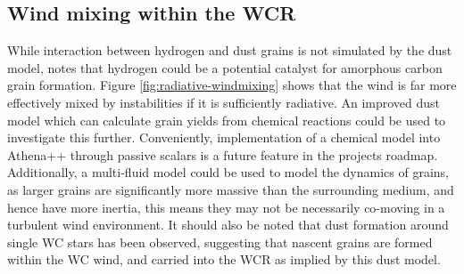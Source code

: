 
\subsection{Wind mixing within the WCR}


While interaction between hydrogen and dust grains is not simulated by the dust model, \textcite{leteuffModelDustFormation2002} notes that hydrogen could be a potential catalyst for amorphous carbon grain formation.
Figure \ref{fig:radiative-windmixing} shows that the wind is far more effectively mixed by instabilities if it is sufficiently radiative.
An improved dust model which can calculate grain yields from chemical reactions could be used to investigate this further.
Conveniently, implementation of a chemical model into Athena++ through passive scalars is a future feature in the projects roadmap.
Additionally, a multi-fluid model could be used to model the dynamics of grains, as larger grains are significantly more massive than the surrounding medium, and hence have more inertia, this means they may not be necessarily co-moving in a turbulent wind environment.
It should also be noted that dust formation around single WC stars has been observed, suggesting that nascent grains are formed within the WC wind, and carried into the WCR as implied by this dust model.

